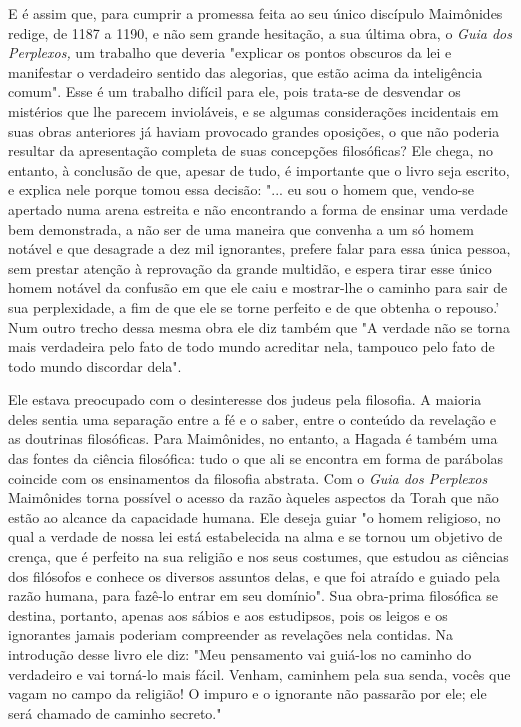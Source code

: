 E é assim que, para cumprir a promessa feita ao seu único discípulo
Maimônides redige, de 1187 a 1190, e não sem grande hesitação, a sua
última obra, o \emph{Guia dos Perplexos,} um trabalho que deveria
"explicar os pontos obs­curos da lei e manifestar o verdadeiro sentido
das alegorias, que estão acima da inteligência comum". Esse é um
trabalho difícil para ele, pois trata-se de des­vendar os mistérios que
lhe parecem invioláveis, e se algumas considerações incidentais em suas
obras anteriores já haviam provocado grandes oposições, o que não
poderia resultar da apresentação completa de suas concepções
filo­sóficas? Ele chega, no entanto, à conclusão de que, apesar de tudo,
é importan­te que o livro seja escrito, e explica nele porque tomou essa
decisão: "... eu sou o homem que, vendo-se apertado numa arena estreita
e não encontrando a forma de ensinar uma verdade bem demonstrada, a não
ser de uma maneira que convenha a um só homem notável e que desagrade a
dez mil ignorantes, prefere falar para essa única pessoa, sem prestar
atenção à reprovação da gran­de multidão, e espera tirar esse único
homem notável da confusão em que ele caiu e mostrar-lhe o caminho para
sair de sua perplexidade, a fim de que ele se torne perfeito e de que
obtenha o repouso.' Num outro trecho dessa mes­ma obra ele diz também
que "A verdade não se torna mais verdadeira pelo fato de todo mundo
acreditar nela, tampouco pelo fato de todo mundo discordar dela".

Ele estava preocupado com o desinteresse dos judeus pela filosofia. A
maioria deles sentia uma separação entre a fé e o saber, entre o
conteúdo da revelação e as doutrinas filosóficas. Para Maimônides, no
entanto, a Hagada é também uma das fontes da ciência filosófica: tudo o
que ali se encontra em forma de parábolas coincide com os ensinamentos
da filosofia abstrata. Com o \emph{Guia
dos Perplexos} Maimônides torna possível o acesso da razão àqueles
as­pectos da Torah que não estão ao alcance da capacidade humana. Ele
deseja guiar "o homem religioso, no qual a verdade de nossa lei está
estabelecida na alma e se tornou um objetivo de crença, que é perfeito
na sua religião e nos seus costumes, que estudou as ciências dos
filósofos e conhece os diversos as­suntos delas, e que foi atraído e
guiado pela razão humana, para fazê-lo entrar em seu domínio". Sua
obra-prima filosófica se destina, portanto, apenas aos sábios e aos
estudipsos, pois os leigos e os ignorantes jamais poderiam com­preender
as revelações nela contidas. Na introdução desse livro ele diz: "Meu
pensamento vai guiá-los no caminho do verdadeiro e vai torná-lo mais
fácil. Venham, caminhem pela sua senda, vocês que vagam no campo da
religião! O impuro e o ignorante não passarão por ele; ele será chamado
de caminho secreto."

